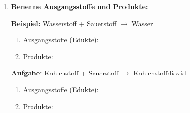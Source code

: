 \begin{enumerate}[label=\arabic*.]
    \vspace{1cm}

    \item \textbf{Benenne Ausgangsstoffe und Produkte:}
    \vspace{0.5cm}

    \textbf{Beispiel:} Wasserstoff + Sauerstoff $\rightarrow$ Wasser

    \begin{enumerate}[label=\alph*)]
        \item Ausgangsstoffe (Edukte): \underline{\hspace{5cm}}
        \item Produkte: \underline{\hspace{5cm}}
    \end{enumerate}

    \vspace{0.5cm}

    \textbf{Aufgabe:} Kohlenstoff + Sauerstoff $\rightarrow$ Kohlenstoffdioxid

    \begin{enumerate}[label=\alph*)]
        \item Ausgangsstoffe (Edukte): \underline{\hspace{5cm}}
        \item Produkte: \underline{\hspace{5cm}}
    \end{enumerate}

\end{enumerate}